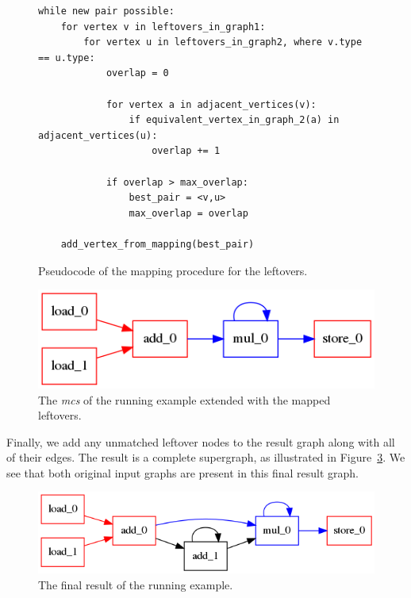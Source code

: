 \begin{figure}[!htb]
\begin{lstlisting}[title={Mapping leftovers}, keywords={for, in, where, if, while, and}]
while new pair possible:
    for vertex v in leftovers_in_graph1:
        for vertex u in leftovers_in_graph2, where v.type == u.type:
            overlap = 0

            for vertex a in adjacent_vertices(v):
                if equivalent_vertex_in_graph_2(a) in adjacent_vertices(u):
                    overlap += 1

            if overlap > max_overlap:
                best_pair = <v,u>
                max_overlap = overlap

    add_vertex_from_mapping(best_pair)
\end{lstlisting}
    \caption{Pseudocode of the mapping procedure for the leftovers.}
    \label{fig:mapping}
\end{figure}

\begin{figure}[!htb]
    \centering
    \includegraphics[scale=0.5]{graphs/running_example1+running_example2_extended.png}
    \caption{The \textit{mcs} of the running example extended with the mapped leftovers.}
    \label{fig:runningextended}
\end{figure}

Finally, we add any unmatched leftover nodes to the result graph along with all of their edges. The result is a complete supergraph, as illustrated in Figure~\ref{fig:runningfinal}. We see that both original input graphs are present in this final result graph.

\begin{figure}[!htb]
    \centering
    \includegraphics[scale=0.5]{graphs/running_example1+running_example2.png}
    \caption{The final result of the running example.}
    \label{fig:runningfinal}
\end{figure}

